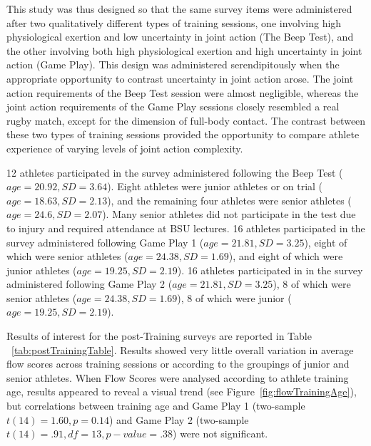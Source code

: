 \begin{CJK}{UTF8}{gbsn}
This study was thus designed so that the same survey items were administered after two qualitatively different types of training sessions, one involving high physiological exertion and low uncertainty in joint action (The Beep Test), and the other involving both high physiological exertion and high uncertainty in joint action (Game Play).  This design was administered serendipitously when the appropriate opportunity to contrast uncertainty in joint action arose.  The joint action requirements of the Beep Test session were almost negligible, whereas the joint action requirements of the Game Play sessions closely resembled a real rugby match, except for the dimension of full-body contact.  The contrast between these two types of training sessions provided the opportunity to compare athlete experience of varying levels of joint action complexity.

12 athletes participated in the survey administered following the Beep Test ($age = 20.92, SD = 3.64$). Eight athletes were junior athletes or on trial ($age = 18.63, SD = 2.13$), and the remaining four athletes were senior athletes ($age = 24.6, SD = 2.07$).  Many senior athletes did not participate in the test due to injury and required attendance at BSU lectures.  16 athletes participated in the survey administered following Game Play 1 ($age = 21.81, SD = 3.25$), eight of which were senior athletes ($age = 24.38, SD =1.69$), and eight of which were junior athletes ($age = 19.25, SD = 2.19$).  16 athletes participated in in the survey administered following Game Play 2 ($age = 21.81, SD = 3.25$), 8 of which were senior athletes ($age = 24.38, SD =1.69$), 8 of which were junior ($age = 19.25, SD = 2.19$).



Results of interest for the post-Training surveys are reported in Table ~\ref{tab:postTrainingTable}.  Results showed very little overall variation in average flow scores across training sessions or according to the groupings of junior and senior athletes.  When Flow Scores were analysed according to athlete training age, results appeared to reveal a visual trend (see Figure~\ref{fig:flowTrainingAge}), but correlations between training age and Game Play 1 (two-sample $t(14) = 1.60, p = 0.14$)  and Game Play 2  (two-sample $t(14) = .91, df = 13, p-value = .38$) were not significant.


\end{CJK}
